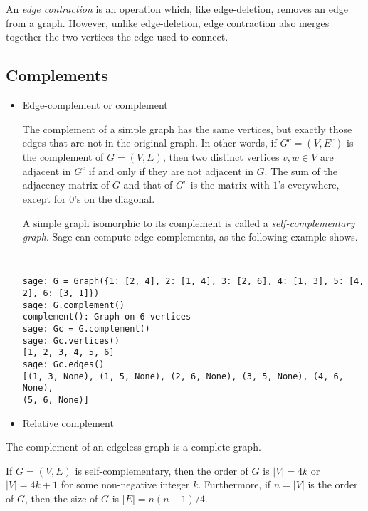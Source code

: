 An {\it edge contraction} is an operation which, like edge-deletion,
removes an edge from a graph. However, unlike edge-deletion,
edge contraction also merges together the two vertices the edge
used to connect.


\subsection{Complements}

\begin{itemize}
\item Edge-complement or complement

The complement of a simple graph has the same vertices, but exactly those
edges that are not in the original graph. In other words, if
$G^c = (V, E^c)$ is the complement of $G = (V,E)$, then two distinct
vertices $v,w \in V$ are adjacent in $G^c$ if and only if they are not
adjacent in $G$. The sum of the adjacency matrix of $G$ and that of
$G^c$ is the matrix with $1$'s everywhere, except for $0$'s on the
diagonal.

A simple graph isomorphic to its complement is called a
\emph{self-complementary graph}.
Sage can compute edge complements, as the following example shows.
%
\begin{center}
\fontsize{9pt}{9pt}
\selectfont
\tt
\begin{lstlisting}
sage: G = Graph({1: [2, 4], 2: [1, 4], 3: [2, 6], 4: [1, 3], 5: [4, 2], 6: [3, 1]})
sage: G.complement()
complement(): Graph on 6 vertices
sage: Gc = G.complement()
sage: Gc.vertices()
[1, 2, 3, 4, 5, 6]
sage: Gc.edges()
[(1, 3, None), (1, 5, None), (2, 6, None), (3, 5, None), (4, 6, None),
(5, 6, None)]
\end{lstlisting}
\end{center}

\item Relative complement
\end{itemize}

\begin{theorem}
The complement of an edgeless graph is a complete graph.
\end{theorem}

\begin{theorem}
If $G = (V, E)$ is self-complementary, then the order of $G$ is
$|V| = 4k$ or $|V| = 4k + 1$ for some non-negative integer
$k$. Furthermore, if $n = |V|$ is the order of $G$, then the size of
$G$ is $|E| = n(n - 1) / 4$.
\end{theorem}



